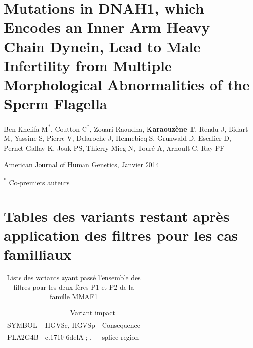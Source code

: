 \documentclass[12pt,twoside]{reedthesis}
\theoremstyle{definition}
\theoremstyle{definition}
\theoremstyle{remark}
\begin{document}
  \appendix
  
  \hypertarget{dnah12014}{\chapter{Mutations in DNAH1, which Encodes an
  Inner Arm Heavy Chain Dynein, Lead to Male Infertility from Multiple
  Morphological Abnormalities of the Sperm Flagella}\label{dnah12014}}
  
  Ben Khelifa M\textsuperscript{*}, Coutton C\textsuperscript{*}, Zouari
  Raoudha, \textbf{Karaouzène T}, Rendu J, Bidart M, Yassine S, Pierre V,
  Delaroche J, Hennebicq S, Grunwald D, Escalier D, Pernet-Gallay K, Jouk
  PS, Thierry-Mieg N, Touré A, Arnoult C, Ray PF
  
  American Journal of Human Genetics, Janvier 2014
  
  \textsuperscript{*} Co-premiers auteurs
  
  \newpage
  
  
  
  \newpage
  
  \newpage
  
  \chapter{Tables des variants restant après application des filtres pour
  les cas
  familliaux}\label{tables-des-variants-restant-apres-application-des-filtres-pour-les-cas-familliaux}
  
  \begin{longtable}[t]{lll}
  \caption{\label{tab:tabmmaf1}Liste des variants ayant passé l'ensemble des filtres pour les deux fères P1 et P2 de la famille MMAF1}\\
  \toprule
  \multicolumn{1}{c}{ } & \multicolumn{2}{c}{Variant impact} \\
  \cmidrule(l{2pt}r{2pt}){2-3}
  SYMBOL & HGVSc, HGVSp & Consequence\\
  \midrule
  PLA2G4B & c.1710-6delA ; . & splice region\\
  \bottomrule
  \end{longtable}
  
\end{document}
